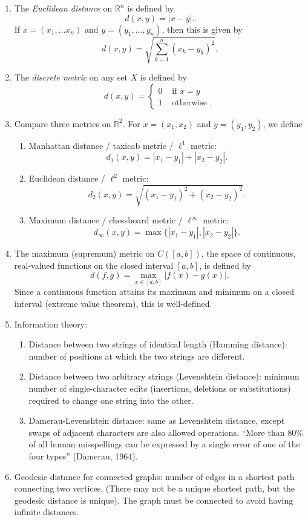 \documentclass[12pt]{amsart}         %
\theoremstyle{remark}
\newcommand{\R}{\mathbb{R}}
\begin{document}
\begin{enumerate}
\item The \emph{Euclidean distance} on $\R^n$ is defined by
\[
d(x,y) = |x-y|.
\]
If $x = (x_1, \dots x_n)$ and $y = (y_1, \dots, y_n)$, then this is given by
\[
d(x,y) = \sqrt{ \sum_{k=1}^n (x_k - y_k)^2 }.
\]
\item The \emph{discrete metric} on any set $X$ is defined by
\[
d(x,y) = 
\begin{cases} 
    0 & \text{ if } x=y \\
    1 & \text{ otherwise }.
\end{cases}
\]
\item Compare three metrics on $\R^2$. For $x = (x_1, x_2)$ and $y = (y_1, y_2)$, we define
\begin{enumerate}
    \item Manhattan distance / taxicab metric / $\ell^1$ metric:
    \[
    d_1(x,y) = |x_1 - y_1| + |x_2 - y_2|.
    \]
    \item Euclidean distance / $\ell^2$ metric:
    \[
    d_2(x,y) = \sqrt{ (x_1 - y_1)^2 + (x_2 - y_2)^2 }.
    \]
    \item Maximum distance / chessboard metric / $\ell^\infty$ metric:
    \[
    d_\infty(x,y) = \max\{ |x_1 - y_1|,  |x_2 - y_2| \}.
    \]
\end{enumerate}

\item The maximum (supremum) metric on $C([a, b])$, the space of continuous, real-valued functions on the closed interval $[a, b]$, is defined by
\[
d(f, g) = \max_{x \in [a,b]}|f(x) - g(x)|.
\]
Since a continuous function attains its maximum and minimum on a closed interval (extreme value theorem), this is well-defined.

\item Information theory:
\begin{enumerate}
    \item Distance between two strings of identical length (Hamming distance): number of positions at which the two strings are different.
    \item Distance between two arbitrary strings (Levenshtein distance): minimum number of single-character edits (insertions, deletions or substitutions) required to change one string into the other.
    \item Damerau-Levenshtein distance: same as  Levenshtein distance, except swaps of adjacent characters are also allowed operations. ``More than 80\% of all human misspellings can be expressed by a single error of one of the four types'' (Damerau, 1964).
\end{enumerate}
    
\item Geodesic distance for connected graphs: number of edges in a shortest path connecting two vertices. (There may not be a unique shortest path, but the geodesic distance is unique). The graph must be connected to avoid having infinite distances.

\end{enumerate}
\end{document}
